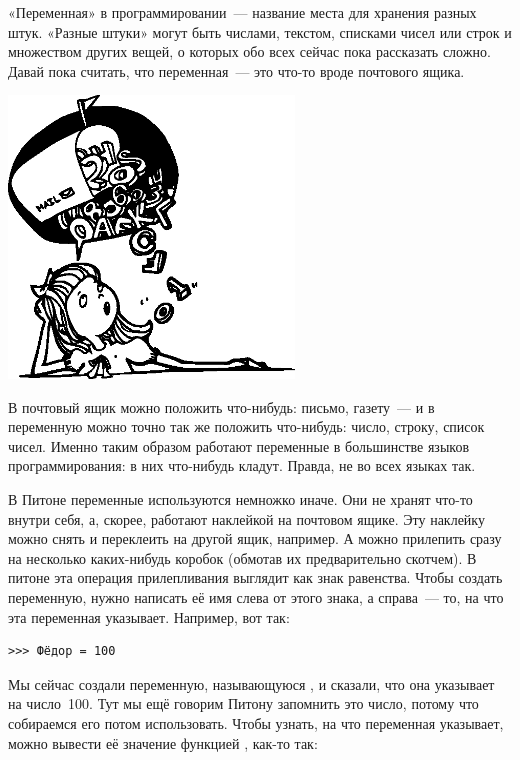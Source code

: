 «Переменная» в программировании — название места для хранения разных штук. «Разные штуки» могут быть числами, текстом, списками чисел или строк и множеством других вещей, о которых обо всех сейчас пока рассказать сложно. Давай пока считать, что переменная — это что-то вроде почтового ящика.

\begin{center}
\includegraphics*[width=76mm]{../en/girlbubble.eps}
\end{center}

В почтовый ящик можно положить что-нибудь: письмо, газету — и в переменную можно точно так же положить что-нибудь: число, строку, список чисел. Именно таким образом работают переменные в большинстве языков программирования: в них что-нибудь кладут. Правда, не во всех языках так.

В Питоне переменные используются немножко иначе. Они не хранят что-то внутри себя, а, скорее, работают наклейкой на почтовом ящике. Эту наклейку можно снять и переклеить на другой ящик, например. А можно прилепить сразу на несколько каких-нибудь коробок (обмотав их предварительно скотчем). В питоне эта операция прилепливания выглядит как знак равенства. Чтобы создать переменную, нужно написать её имя слева от этого знака, а справа — то, на что эта переменная указывает. Например, вот так:

\begin{listing}
\begin{verbatim}
>>> Фёдор = 100
\end{verbatim}
\end{listing}

Мы сейчас создали переменную, называющуюся , и сказали, что она указывает на число 100. Тут мы ещё говорим Питону запомнить это число, потому что собираемся его потом использовать. Чтобы узнать, на что переменная указывает, можно вывести её значение функцией , как-то так:

